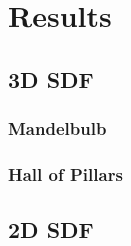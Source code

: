 \chapter{Results}
\label{chapter4}

\section{3D SDF}

\subsection{Mandelbulb}

\subsection{Hall of Pillars}

\section{2D SDF}